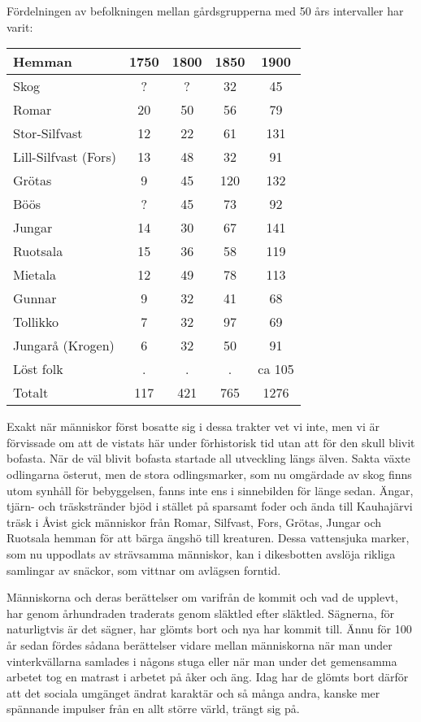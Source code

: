 Fördelningen av befolkningen mellan gårdsgrupperna med 50 års intervaller har varit:

\begin{center}
  \begin{tabular}{lcccc}
    \hline
    Hemman & 1750 & 1800 & 1850 & 1900 \\ \hline
    Skog & ? & ? & 32 & 45 \\
    Romar & 20 & 50 & 56 & 79 \\
    Stor-Silfvast & 12 & 22 & 61 & 131 \\
    Lill-Silfvast (Fors) & 13 & 48 & 32 & 91 \\
    Grötas & 9 & 45 & 120 & 132 \\
    Böös & ? & 45 & 73 & 92 \\
    Jungar & 14 & 30 & 67 & 141 \\
    Ruotsala & 15 & 36 & 58 & 119 \\
    Mietala & 12 & 49 & 78 & 113 \\
    Gunnar & 9 & 32 & 41 & 68 \\
    Tollikko & 7 & 32 & 97 & 69 \\
    Jungarå (Krogen) & 6 & 32 & 50 & 91 \\
    Löst folk & . & . & . & ca 105 \\ \hline
    Totalt & 117 & 421 & 765 & 1276 \\
    \hline
  \end{tabular}
\end{center}

%

Exakt när människor först bosatte sig i dessa trakter vet vi inte, men vi är förvissade om att de vistats här under förhistorisk tid utan att för den skull blivit bofasta. När de väl blivit bofasta startade all utveckling längs älven. Sakta växte odlingarna österut, men de stora odlingsmarker, som nu omgärdade av skog finns utom synhåll för bebyggelsen, fanns inte ens i sinnebilden för länge sedan. Ängar, tjärn- och träskstränder bjöd i stället på sparsamt foder och ända till Kauhajärvi träsk i Åvist gick människor från Romar, Silfvast, Fors, Grötas, Jungar och Ruotsala hemman för att bärga ängshö till kreaturen. Dessa vattensjuka marker, som nu uppodlats av strävsamma människor, kan i dikesbotten avslöja rikliga samlingar av snäckor, som vittnar om avlägsen forntid.


Människorna och deras berättelser om varifrån de kommit och vad de upplevt, har genom århundraden traderats genom släktled efter släktled. Sägnerna, för naturligtvis är det sägner, har glömts bort och nya har kommit till. Ännu för 100 år sedan fördes sådana berättelser vidare mellan människorna när man under vinterkvällarna samlades i någons stuga eller när man under det gemensamma arbetet tog en matrast i arbetet på åker och äng. Idag har de glömts bort därför att det sociala umgänget ändrat karaktär och så många andra, kanske mer spännande impulser från en allt större värld, trängt sig på.
